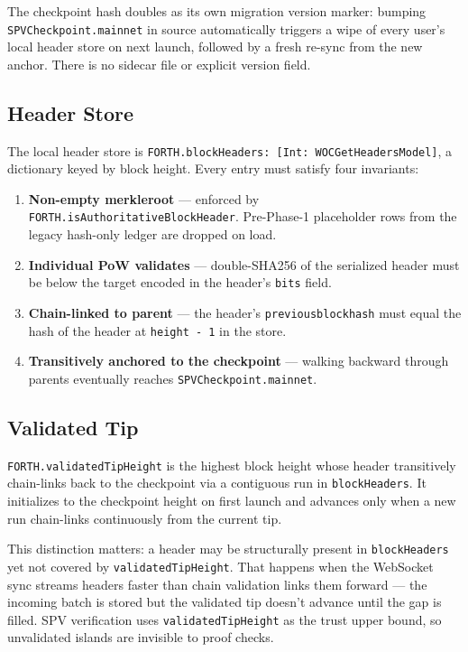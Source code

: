 \documentclass[a4paper, 11pt, openany]{book}
\begin{document}
The checkpoint hash doubles as its own migration version marker: bumping \texttt{SPVCheckpoint.mainnet} in source automatically triggers a wipe of every user's local header store on next launch, followed by a fresh re-sync from the new anchor. There is no sidecar file or explicit version field.

\subsection{Header Store}

The local header store is \texttt{FORTH.blockHeaders: [Int: WOCGetHeadersModel]}, a dictionary keyed by block height. Every entry must satisfy four invariants:

\begin{enumerate}
\item \textbf{Non-empty merkleroot} --- enforced by \texttt{FORTH.is\-Authoritative\-Block\-Header}. Pre-Phase-1 placeholder rows from the legacy hash-only ledger are dropped on load.
\item \textbf{Individual PoW validates} --- double-SHA256 of the serialized header must be below the target encoded in the header's \texttt{bits} field.
\item \textbf{Chain-linked to parent} --- the header's \texttt{previousblockhash} must equal the hash of the header at \texttt{height - 1} in the store.
\item \textbf{Transitively anchored to the checkpoint} --- walking backward through parents eventually reaches \texttt{SPVCheckpoint.mainnet}.
\end{enumerate}

\subsection{Validated Tip}

\texttt{FORTH.validatedTipHeight} is the highest block height whose header transitively chain-links back to the checkpoint via a contiguous run in \texttt{blockHeaders}. It initializes to the checkpoint height on first launch and advances only when a new run chain-links continuously from the current tip.

This distinction matters: a header may be structurally present in \texttt{blockHeaders} yet not covered by \texttt{validatedTipHeight}. That happens when the WebSocket sync streams headers faster than chain validation links them forward --- the incoming batch is stored but the validated tip doesn't advance until the gap is filled. SPV verification uses \texttt{validatedTipHeight} as the trust upper bound, so unvalidated islands are invisible to proof checks.
\end{document}
